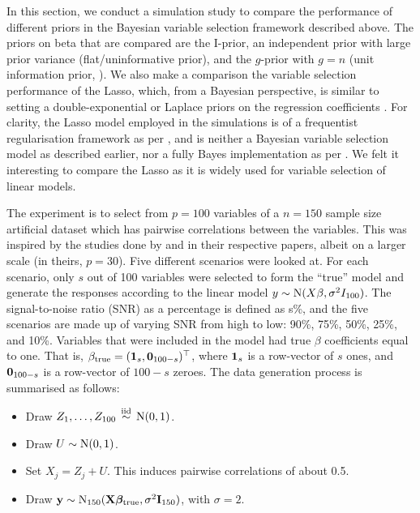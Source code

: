 \documentclass[a4paper,showframe,11pt]{report}
\begin{document}
In this section, we conduct a simulation study to compare the performance of different priors in the Bayesian variable selection framework described above.
The priors on beta that are compared are the I-prior, an independent prior with large prior variance (flat/uninformative prior), and the $g$-prior with $g=n$ (unit information prior, \cite{Ntzoufras2008}).
We also make a comparison the variable selection performance of the Lasso, which, from a Bayesian perspective, is similar to setting a double-exponential or Laplace priors on the regression coefficients \citep{park2008bayesian}. 
For clarity, the Lasso model employed in the simulations is of a frequentist regularisation framework as per \citet{tibshirani1996regression}, and is neither a Bayesian variable selection model as described earlier, nor a fully Bayes implementation as per \citet{park2008bayesian}.
We felt it interesting to compare the Lasso as it is widely used for variable selection of linear models.

The experiment is to select from $p=100$ variables of a $n=150$ sample size artificial dataset which has pairwise correlations between the variables. This was inspired by the studies done by \citet{George1993} and \citet{Kuo1998} in their respective papers, albeit on a larger scale (in theirs, $p=30$).
Five different scenarios were looked at. 
For each scenario, only $s$ out of 100 variables were selected to form the ``true'' model and generate the responses according to the linear model $y\sim\operatorname{N}(X\beta,\sigma^2 I_{100})$. 
The signal-to-noise ratio (SNR) as a percentage is defined as s\%, and the five scenarios are made up of varying SNR from high to low: 90\%, 75\%, 50\%, 25\%, and 10\%.
Variables that were included in the model had true $\beta$ coefficients equal to one.
That is, $\beta_\text{true}=({\mathbf 1}_{s},{\mathbf 0}_{100-s})^\top$, where ${\mathbf 1}_{s}$ is a row-vector of $s$ ones, and ${\mathbf 0}_{100-s}$ is a row-vector of $100-s$ zeroes.
The data generation process is summarised as follows:
\begin{itemize}
	\item Draw $Z_1, \dots, Z_{100} \,\overset{\text{iid}}{\sim}\, \operatorname{N}(0, 1)$.
	\item Draw $U \sim \operatorname{N}(0, 1)$.
	\item Set $X_j = Z_j + U$. This induces pairwise correlations of about 0.5.\footnotemark
	\item Draw ${\mathbf y} \sim \operatorname{N}_{150}({\mathbf X} {\bm\beta}_{\text{true}}, \sigma^2\mathbf I_{150})$, with $\sigma=2$.
\end{itemize}
\end{document}
